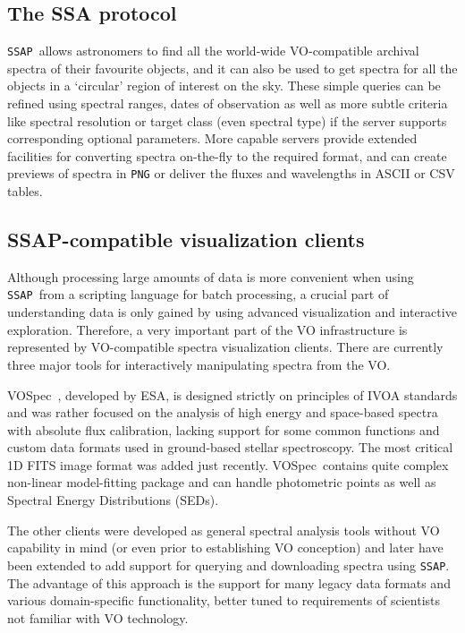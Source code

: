 \documentclass[final,authoryear,5p,times,twocolumn]{elsarticle}
\newcommand{\ssap}{\texttt{SSAP}}
\newcommand{\vospec}{\textsf{\small VOSpec}}
\newcommand{\ascl}[1]{\href{http://www.ascl.net/#1}{ascl:#1}}
\begin{document}
\subsection{The SSA protocol}
%
\ssap\ allows astronomers to find all the world-wide VO-compatible archival
spectra of their favourite objects, and it can also be used to get spectra for all
the objects in a `circular' region of interest on the sky. These simple
queries can be refined using spectral ranges, dates of observation as well as
more subtle criteria like spectral resolution or target class (even
spectral type) if the server supports corresponding optional parameters. More capable servers
provide extended facilities for converting spectra on-the-fly to the required
format, and can create previews of spectra in \texttt{PNG} or deliver
the fluxes and wavelengths in ASCII or CSV tables.

\subsection{SSAP-compatible visualization clients}

Although processing large amounts of data is more convenient when
using \ssap\ from a scripting language for batch processing, a crucial
part of understanding data is only gained by using advanced visualization and interactive
exploration.  Therefore, a very important part of the VO
infrastructure is represented by VO-compatible spectra visualization
clients. There are currently three major tools for interactively manipulating
spectra from the VO.

\vospec\ \citep[][\ascl{1205.011}]{2005ASPC..347..198O}, developed by ESA, is
designed strictly on principles of IVOA standards and was rather focused on
the analysis of high energy and space-based spectra with absolute flux
calibration, lacking support for some common functions and custom data formats
used in ground-based stellar spectroscopy. The most critical 1D FITS image
format was added just recently. \vospec\ contains quite complex non-linear
model-fitting package and can handle photometric points as well as Spectral
Energy Distributions (SEDs).

The other clients were developed as general spectral analysis
tools without  VO capability in mind (or even prior to establishing VO conception) and later have been extended to add
support for querying and downloading spectra using \ssap.  The
advantage of this approach is the support for many legacy data formats
and various domain-specific functionality, better tuned to
requirements of scientists not familiar with VO technology.
\end{document}
